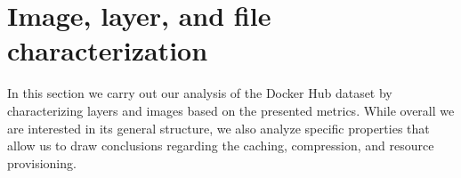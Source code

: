 

\section{Image, layer, and file characterization}
\label{sec:image-char}



In this section we carry out our analysis of the Docker Hub dataset by characterizing
layers and images based on
the presented metrics. While overall we are interested in its general structure,
we also analyze specific properties that allow us to draw conclusions regarding the
caching, compression, and resource provisioning.



